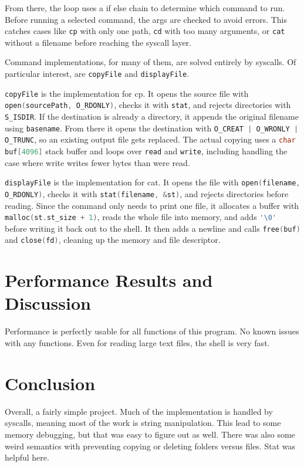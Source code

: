\documentclass[12pt]{article}
\begin{document}
From there, the loop uses a if else chain to determine which command to run. Before running a selected command, the args are checked to avoid errors. This catches cases like \lstinline[language=C]|cp| with only one path, \lstinline[language=C]|cd| with too many arguments, or \lstinline[language=C]|cat| without a filename before reaching the syscall layer.

Command implementations, for many of them, are solved entirely by syscalls. Of particular interest, are \lstinline[language=C]|copyFile| and \lstinline[language=C]|displayFile|.

\lstinline[language=C]|copyFile| is the implementation for cp. It opens the source file with \lstinline[language=C]|open(sourcePath, O_RDONLY)|, checks it with \lstinline[language=C]|stat|, and rejects directories with \lstinline[language=C]|S_ISDIR|. If the destination is already a directory, it appends the original filename using \lstinline[language=C]|basename|. From there it opens the destination with \lstinline[language=C]!O_CREAT | O_WRONLY | O_TRUNC!, so an existing output file gets replaced. The actual copying uses a \lstinline[language=C]|char buf[4096]| stack buffer and loops over \lstinline[language=C]|read| and \lstinline[language=C]|write|, including handling the case where write writes fewer bytes than were read.

\lstinline[language=C]|displayFile| is the implementation for cat. It opens the file with \lstinline[language=C]|open(filename, O_RDONLY)|, checks it with \lstinline[language=C]|stat(filename, &st)|, and rejects directories before reading. Since the command only needs to print one file, it allocates a buffer with \lstinline[language=C]|malloc(st.st_size + 1)|, reads the whole file into memory, and adds \lstinline[language=C]|'\0'| before writing it back out to the shell. It then adds a newline and calls \lstinline[language=C]|free(buf)| and \lstinline[language=C]|close(fd)|, cleaning up the memory and file descriptor.

\section{Performance Results and Discussion}
Performance is perfectly usable for all functions of this program. No known issues with any functions. Even for reading large text files, the shell is very fast.

\section{Conclusion}
Overall, a fairly simple project. Much of the implementation is handled by syscalls, meaning most of the work is string manipulation. This lead to some memory debugging, but that was easy to figure out as well. There was also some weird semantics with preventing copying or deleting folders versus files. Stat was helpful here.
\end{document}
